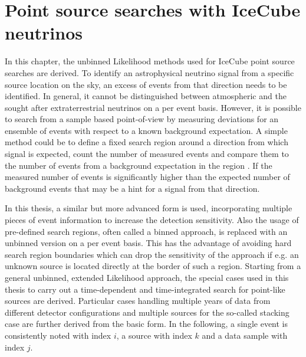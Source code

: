 \chapter{Point source searches with IceCube neutrinos}
  \label{chp:pointsource}
In this chapter, the unbinned Likelihood methods used for IceCube point source searches are derived.
To identify an astrophysical neutrino signal from a specific source location on the sky, an excess of events from that direction needs to be identified.
In general, it cannot be distinguished between atmospheric and the sought after extraterrestrial neutrinos on a per event basis.
However, it is possible to search from a sample based point-of-view by measuring deviations for an ensemble of events with respect to a known background expectation.
A simple method could be to define a fixed search region around a direction from which signal is expected, count the number of measured events and compare them to the number of events from a background expectation in the region \cite{LiMa:1983ApJ}.
If the measured number of events is significantly higher than the expected number of background events that may be a hint for a signal from that direction.

In this thesis, a similar but more advanced form is used, incorporating multiple pieces of event information to increase the detection sensitivity.
Also the usage of pre-defined search regions, often called a binned approach, is replaced with an unbinned version on a per event basis.
This has the advantage of avoiding hard search region boundaries which can drop the sensitivity of the approach if e.g. an unknown source is located directly at the border of such a region.
Starting from a general unbinned, extended Likelihood approach, the special cases used in this thesis to carry out a time-dependent and time-integrated search for point-like sources are derived.
Particular cases handling multiple years of data from different detector configurations and multiple sources for the so-called stacking case are further derived from the basic form.
In the following, a single event is consistently noted with index $i$, a source with index $k$ and a data sample with index $j$.

